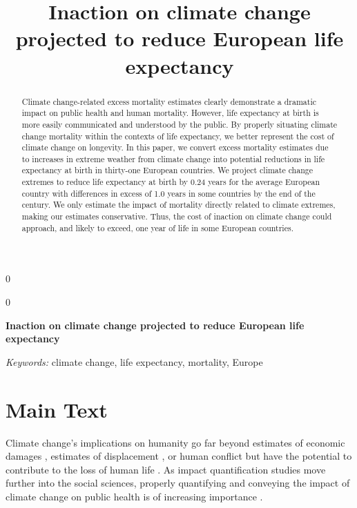 \documentclass[12pt]{article}
\newcommand{\blind}{0}
\begin{document}
\def\spacingset#1{\renewcommand{\baselinestretch}%
{#1}\small\normalsize} \spacingset{1}



\blind
{
  \title{\bf Inaction on climate change projected to reduce European life expectancy}

  \author{
      }
  \maketitle
} \fi

\blind
{
  \bigskip
  \bigskip
  \bigskip
  \begin{center}
    {\LARGE\bf Inaction on climate change projected to reduce European life expectancy}
  \end{center}
  \medskip
} \fi

\bigskip
\begin{abstract}
Climate change-related excess mortality estimates clearly demonstrate a
dramatic impact on public health and human mortality. However, life
expectancy at birth is more easily communicated and understood by the
public. By properly situating climate change mortality within the
contexts of life expectancy, we better represent the cost of climate
change on longevity. In this paper, we convert excess mortality
estimates due to increases in extreme weather from climate change into
potential reductions in life expectancy at birth in thirty-one European
countries. We project climate change extremes to reduce life expectancy
at birth by 0.24 years for the average European country with differences
in excess of 1.0 years in some countries by the end of the century. We
only estimate the impact of mortality directly related to climate
extremes, making our estimates conservative. Thus, the cost of inaction
on climate change could approach, and likely to exceed, one year of life
in some European countries.
\end{abstract}

\noindent%
{\it Keywords:} climate change, life expectancy, mortality, Europe
\vfill

\newpage
\spacingset{1.45} %

\section{Main Text}\label{main-text}

Climate change's implications on humanity go far beyond estimates of
economic damages \citep{hsiang2017estimating}, estimates of displacement
\citep{rigaud2018groundswell}, or human conflict
\citep{barnett2007climate} but have the potential to contribute to the
loss of human life \citep{forzieri2017increasing, pachauri2014climate}.
As impact quantification studies move further into the social sciences,
properly quantifying and conveying the impact of climate change on
public health is of increasing importance
\citep{melillo2014climate, cloyd2016engagement}.
\end{document}
